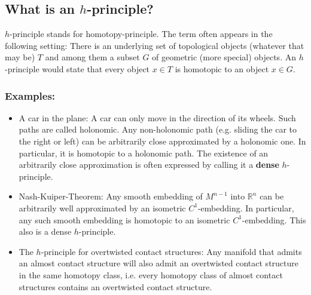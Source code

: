 
\subsection{What is an $h$-principle?}\label{sec:h_principle}
$h$-principle stands for homotopy-principle. The term often appears in the following setting: There is an underlying set of topological objects (whatever that may be) $T$
and among them a subset $G$ of geometric (more special) objects. An $h$-principle would state that every object $x \in T$ is homotopic to an object $x \in G$.

\subsubsection*{Examples:}
\begin{itemize}
    \item A car in the plane: A car can only move in the direction of its wheels. Such paths are called holonomic. Any non-holonomic path (e.g. sliding the car
    to the right or left) can be arbitrarily close approximated by a holonomic one. In particular, it is homotopic to a holonomic path.
    The existence of an arbitrarily close approximation is often expressed by calling it a \textbf{dense} $h$-principle.
    \item Nash-Kuiper-Theorem: Any smooth embedding of $M^{n-1}$ into $\mathbb R^n$ can be arbitrarily well approximated by an isometric $C^1$-embedding. 
    In particular, any such smooth embedding is homotopic to an isometric $C^1$-embedding. This also is a dense $h$-principle.
    \item The $h$-principle for overtwisted contact structures: Any manifold that admits an almost contact structure will also admit an overtwisted
    contact structure in the same homotopy class, i.e. every homotopy class of almost contact structures contains an overtwisted contact structure.
\end{itemize}


